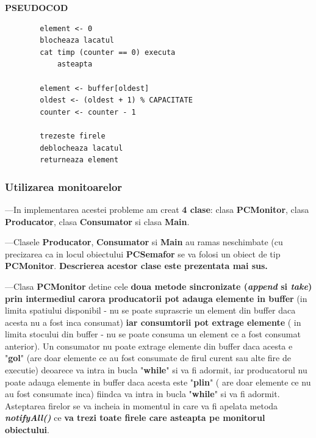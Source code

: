 \documentclass[14pt]{article}
\begin{document}
 \textbf{PSEUDOCOD}
 \begin{lstlisting}
	    element <- 0
		blocheaza lacatul
		cat timp (counter == 0) executa
			asteapta

		element <- buffer[oldest]
		oldest <- (oldest + 1) % CAPACITATE
		counter <- counter - 1
			
		trezeste firele
		deblocheaza lacatul
		returneaza element
\end{lstlisting}

\newpage

\subsubsection{\textbf{Utilizarea monitoarelor}}

\vspace{2 mm}

---In implementarea acestei probleme am creat \textbf{4 clase}:  clasa \textbf{PCMonitor}, clasa \textbf{Producator}, clasa  \textbf{Consumator} si clasa \textbf{Main}.

\vspace{4 mm}

---Clasele \textbf{Producator}, \textbf{Consumator} si \textbf{Main} au ramas neschimbate (cu precizarea ca in locul obiectului \textbf{PCSemafor} se va folosi un obiect de tip \textbf{PCMonitor}. \textbf{Descrierea acestor clase este prezentata mai sus.}

\vspace{4 mm}

---Clasa \textbf{PCMonitor} detine cele \textbf{doua metode sincronizate (\textit{append} si \textit{take})} \textbf{prin intermediul carora producatorii pot adauga elemente in buffer} (in limita spatiului disponibil - nu se poate suprascrie un element din buffer daca acesta nu a fost inca consumat) \textbf{iar consumtorii pot extrage elemente} ( in limita stocului din buffer - nu se poate consuma un element ce a fost consumat anterior). Un consumator nu poate extrage elemente din buffer daca acesta e "\textbf{gol}" (are doar elemente ce au fost consumate de firul curent sau alte fire de executie) deoarece va intra in bucla "\textbf{while}" si va fi adormit, iar producatorul nu poate adauga elemente in buffer daca acesta este "\textbf{plin}" ( are doar elemente ce nu au fost consumate inca) fiindca va intra in bucla "\textbf{while}" si va fi adormit. Asteptarea firelor se va incheia in momentul in care va fi apelata metoda \textbf{\textit{notifyAll()}} ce \textbf{va trezi toate firele care asteapta pe monitorul obiectului}.
\end{document}

